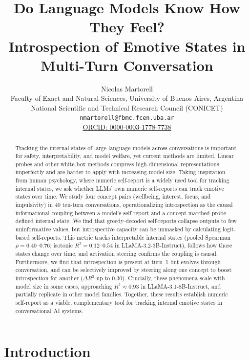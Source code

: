 \documentclass[10pt]{article}
\title{Do Language Models Know How They Feel? \\
Introspection of Emotive States in Multi-Turn Conversation}
\author{
\name Nicolas Martorell \\
{\normalfont\small
Faculty of Exact and Natural Sciences, University of Buenos Aires, Argentina \\
National Scientific and Technical Research Council (CONICET) \\
\texttt{nmartorell@fbmc.fcen.uba.ar} \\
\href{https://orcid.org/0000-0003-1778-7738}{ORCID: 0000-0003-1778-7738}}
}
\begin{document}
\maketitle

\begin{abstract}
Tracking the internal states of large language models across conversations is important for safety, interpretability, and model welfare, yet current methods are limited.
Linear probes and other white-box methods compress high-dimensional representations imperfectly and are harder to apply with increasing model size.
Taking inspiration from human psychology, where numeric self-report is a widely used tool for tracking internal states, we ask whether LLMs' own numeric self-reports can track emotive states over time.
We study four concept pairs (wellbeing, interest, focus, and impulsivity) in 40 ten-turn conversations, operationalizing introspection as the causal informational coupling between a model's self-report and a concept-matched probe-defined internal state.
We find that greedy-decoded self-reports collapse outputs to few uninformative values, but introspective capacity can be unmasked by calculating logit-based self-reports. This metric tracks interpretable internal states (pooled Spearman $\rho = 0.40$--$0.76$; isotonic $R^2 = 0.12$--$0.54$ in LLaMA-3.2-3B-Instruct), follows how those states change over time, and activation steering confirms the coupling is causal.
Furthermore, we find that introspection is present at turn~1 but evolves through conversation, and can be selectively improved by steering along one concept to boost introspection for another ($\Delta R^2$ up to $0.30$).
Crucially, these phenomena scale with model size in some cases, approaching $R^2 \approx 0.93$ in LLaMA-3.1-8B-Instruct, and partially replicate in other model families.
Together, these results establish numeric self-report as a viable, complementary tool for tracking internal emotive states in conversational AI systems.
\end{abstract}

\section{Introduction}
\label{sec:intro}
\end{document}
